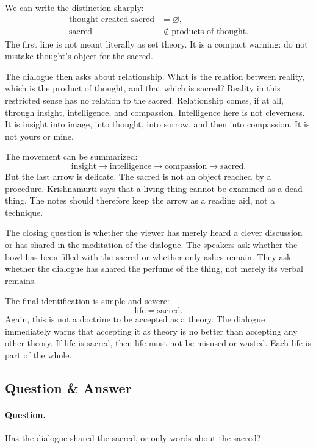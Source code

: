 We can write the distinction sharply:
\begin{align}
\text{thought-created sacred} &= \varnothing, \\
\text{sacred} &\notin \text{products of thought}.
\end{align}
The first line is not meant literally as set theory. It is a compact warning: do not mistake thought's object for the sacred.

The dialogue then asks about relationship. What is the relation between reality, which is the product of thought, and that which is sacred? Reality in this restricted sense has no relation to the sacred. Relationship comes, if at all, through insight, intelligence, and compassion. Intelligence here is not cleverness. It is insight into image, into thought, into sorrow, and then into compassion. It is not yours or mine.

The movement can be summarized:
\begin{equation}
\text{insight}
\longrightarrow
\text{intelligence}
\longrightarrow
\text{compassion}
\longrightarrow
\text{sacred}.
\end{equation}
But the last arrow is delicate. The sacred is not an object reached by a procedure. Krishnamurti says that a living thing cannot be examined as a dead thing. The notes should therefore keep the arrow as a reading aid, not a technique.

The closing question is whether the viewer has merely heard a clever discussion or has shared in the meditation of the dialogue. The speakers ask whether the bowl has been filled with the sacred or whether only ashes remain. They ask whether the dialogue has shared the perfume of the thing, not merely its verbal remains.

The final identification is simple and severe:
\begin{equation}
\text{life} = \text{sacred}.
\end{equation}
Again, this is not a doctrine to be accepted as a theory. The dialogue immediately warns that accepting it as theory is no better than accepting any other theory. If life is sacred, then life must not be misused or wasted. Each life is part of the whole.

\subsection{Question \& Answer}

\paragraph{Question.}
Has the dialogue shared the sacred, or only words about the sacred?

